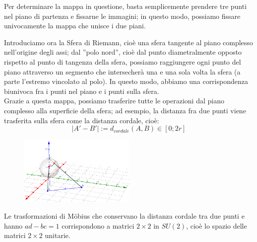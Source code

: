 Per determinare la mappa in questione, basta semplicemente prendere tre punti nel piano di partenza e fissarne le immagini; in questo modo, possiamo fissare univocamente la mappa che unisce i due piani.

Introduciamo ora la Sfera di Riemann, cioè una sfera tangente al piano complesso nell'origine degli assi; dal ''polo nord'', cioè dal punto diametralmente opposto rispetto al punto di  tangenza della sfera, possiamo raggiungere ogni punto del piano attraverso un segmento che intersecherà una e una sola volta la sfera (a parte l'estremo vincolato al polo). In questo modo, abbiamo una corrispondenza biunivoca fra i punti nel piano e i punti sulla sfera.\\
Grazie a questa mappa, possiamo trasferire tutte le operazioni dal piano complesso alla superficie della sfera; ad esempio, la distanza fra due punti viene trasferita sulla sfera come la distanza cordale, cioè:
$$|A'-B'|:=d_{cordale}(A,B) \in [0;2r]$$

\begin{figure}[h!]
  \centering
    \includegraphics[width=0.5\textwidth]{immagini/sferariemann.png}
\end{figure}

Le trasformazioni di M\"{o}bius che conservano la distanza cordale tra due punti e hanno $ad-bc=1$ corrispondono a matrici $2 \times 2$ in $SU(2)$, cioè lo spazio delle matrici $2 \times 2$ unitarie.